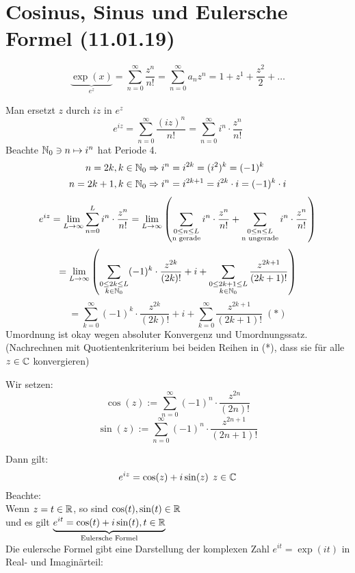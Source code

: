 \documentclass[../ana1u.tex]{subfiles}
\begin{document}
\setcounter{section}{8}

\section{Cosinus, Sinus und Eulersche Formel (11.01.19)}
\begin{bem}
	\[\underbrace{\exp(x)}_{e^z} = \sum_{n=0}^{\infty} \frac{z^n}{n!} = \sum_{n=0}^{\infty} a_n z^n = 1 + z^1 + \frac{z^2}{2} + \dots \]
\end{bem}
Man ersetzt \(z\) durch \(iz\) in \(e^z\)\\
\[e^{iz} = \sum_{n=0}^{\infty} \frac{(iz)^n}{n!} = \sum_{n=0}^{\infty} i^n \cdot \frac{z^n}{n!} \]
Beachte \(\mathbb{N}_0 \ni n \mapsto i^n \) hat Periode 4.
\begin{align*}
	n = 2k, k\in \mathbb{N}_0 &\Rightarrow i^n = i^{2k} = (i^2)^k = (-1)^k\\
	n = 2k+1, k \in \mathbb{N}_0 &\Rightarrow i^n = i^{2k+1} = i^{2k} \cdot i = (-1)^k \cdot i
\end{align*}
\[e^{iz} = \lim\limits_{L\rightarrow\infty} \sum_{n=0}^{L} i^n \cdot \frac{z^n}{n!} = \lim\limits_{L\rightarrow\infty} \left(\sum_{\substack{0 \leq n \leq L \\ \text{n gerade}}} i^n \cdot \frac{z^n}{n!} + \sum_{\substack{0 \leq n \leq L \\ \text{n ungerade}}} i^n \cdot \frac{z^n}{n!}\right) \]
\[= \lim\limits_{L\rightarrow\infty} \left(\sum_{\substack{0 \leq 2k \leq L \\ k \in \mathbb{N}_0}} (-1)^k \cdot \frac{z^{2k}}{(2k)!} + i + \sum_{\substack{0 \leq 2k+1 \leq L \\ k \in \mathbb{N}_0}} \frac{z^{2k+1}}{(2k+1)!} \right) \]
\[= \sum_{k=0}^{\infty} (-1)^k \cdot \frac{z^{2k}}{(2k)!} + i + \sum_{k=0}^{\infty} \frac{z^{2k+1}}{(2k+1)!} \; (*)\]
Umordnung ist okay wegen absoluter Konvergenz und Umordnungssatz.\\
(Nachrechnen mit Quotientenkriterium bei beiden Reihen in (*), dass sie für alle \(z \in \mathbb{C}\) konvergieren)
\begin{defi}
	Wir setzen:
	\[\cos(z) := \sum_{n=0}^{\infty} (-1)^n \cdot \frac{z^{2n}}{(2n)!} \]
	\[\sin(z) := \sum_{n=0}^{\infty} (-1)^n \cdot \frac{z^{2n+1}}{(2n+1)!} \]
\end{defi}
Dann gilt:
\[e^{iz} = \cos(z) + i\sin(z) \; \, z \in \mathbb{C} \]
Beachte:\\
Wenn \(z=t \in \mathbb{R} \), so sind \(\cos(t), \sin(t) \in \mathbb{R}\) \\
und es gilt \(\underbrace{e^{it} = \cos(t) + i\sin(t), t \in \mathbb{R}}_{\text{Eulersche Formel}} \)\\
Die eulersche Formel gibt eine Darstellung der komplexen Zahl \(e^{it} = \exp(it) \) in Real- und Imaginärteil:
\end{document}
